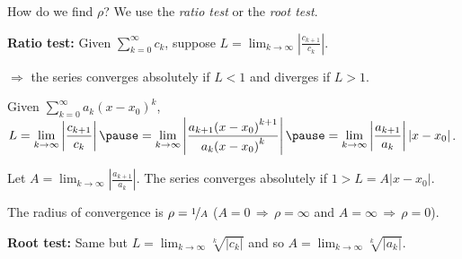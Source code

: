 \documentclass[10pt,aspectratio=169]{beamer}
\begin{document}
\begin{frame}
How do we find $\rho$?  \pause
We use the \emph{ratio test} or the \emph{root test}.

\pause
\textbf{Ratio test:}
Given
\quad
$\displaystyle
\sum_{k=0}^\infty c_k
$,
\quad
suppose
\quad
$L = \lim_{k\to\infty} \left \lvert \frac{c_{k+1}}{c_k} \right \rvert$.

\pause
$\Rightarrow$ \quad
the series converges absolutely if $L < 1$ and
diverges if $L > 1$.

\pause
\medskip

Given
\quad
$\displaystyle
\sum_{k=0}^\infty a_k {(x-x_0)}^k
$,
\quad
$
\displaystyle
L = \lim_{k\to\infty} \left \lvert \frac{c_{k+1}}{c_k} \right \rvert
\pause
=
\lim_{k\to\infty} \left \lvert
\frac{a_{k+1} {(x - x_0)}^{k+1}}{a_k {(x - x_0)}^k}
\right \rvert
\pause
=
\lim_{k\to\infty} \left \lvert
\frac{a_{k+1}}{a_k}
\right \rvert
\lvert  x - x_0 \rvert
$.

\pause
Let
\quad
$\displaystyle A =
\lim_{k\to\infty} \left \lvert
\frac{a_{k+1}}{a_k}
\right \rvert$.
\quad
\pause
The series converges absolutely if $1 > L = A \lvert x - x_0 \rvert$.

\pause
\medskip

The radius of convergence is $\displaystyle \rho = \nicefrac{1}{A}$
\qquad
($A = 0 \, \Rightarrow \, \rho=\infty$ and
$A = \infty \, \Rightarrow \, \rho=0$).

\pause
\medskip

\textbf{Root test:} Same but
\quad
$\displaystyle
L = \lim_{k\to\infty} \sqrt[k]{\lvert c_k \rvert}$
\quad
and so
\quad
$\displaystyle
A = \lim_{k\to\infty} \sqrt[k]{\lvert a_k \rvert}$.

\end{frame}
\end{document}
